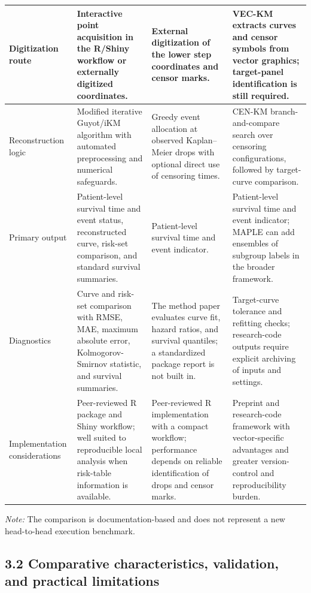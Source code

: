 \documentclass[12pt,letterpaper]{article}
\begin{document}
\begin{nolinenumbers}
\begin{longtable}{|>{\raggedright\arraybackslash}p{0.82in}|>{\raggedright\arraybackslash}p{1.78in}|>{\raggedright\arraybackslash}p{1.78in}|>{\raggedright\arraybackslash}p{1.78in}|}
Digitization route & Interactive point acquisition in the R/Shiny workflow or externally digitized coordinates. & External digitization of the lower step coordinates and censor marks. & VEC-KM extracts curves and censor symbols from vector graphics; target-panel identification is still required. \\ \hline
Reconstruction logic & Modified iterative Guyot/iKM algorithm with automated preprocessing and numerical safeguards. & Greedy event allocation at observed Kaplan--Meier drops with optional direct use of censoring times. & CEN-KM branch-and-compare search over censoring configurations, followed by target-curve comparison. \\ \hline
Primary output & Patient-level survival time and event status, reconstructed curve, risk-set comparison, and standard survival summaries. & Patient-level survival time and event indicator. & Patient-level survival time and event indicator; MAPLE can add ensembles of subgroup labels in the broader framework. \\ \hline
Diagnostics & Curve and risk-set comparison with RMSE, MAE, maximum absolute error, Kolmogorov-Smirnov statistic, and survival summaries. & The method paper evaluates curve fit, hazard ratios, and survival quantiles; a standardized package report is not built in. & Target-curve tolerance and refitting checks; research-code outputs require explicit archiving of inputs and settings. \\ \hline
Implementation considerations & Peer-reviewed R package and Shiny workflow; well suited to reproducible local analysis when risk-table information is available. & Peer-reviewed R implementation with a compact workflow; performance depends on reliable identification of drops and censor marks. & Preprint and research-code framework with vector-specific advantages and greater version-control and reproducibility burden. \\ \hline
\end{longtable}
\endgroup
\end{nolinenumbers}

\emph{Note:} The comparison is documentation-based and does not represent a new head-to-head execution benchmark.

\subsection*{3.2 Comparative characteristics, validation, and practical limitations}
\end{document}
